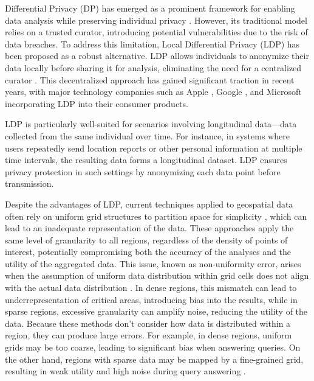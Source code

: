 Differential Privacy (DP) has emerged as a prominent framework for enabling data analysis while preserving individual privacy \cite{DBLP:conf/icalp/Dwork06,cummings2023advancing}. However, its traditional model relies on a trusted curator, introducing potential vulnerabilities due to the risk of data breaches. To address this limitation, Local Differential Privacy (LDP) has been proposed as a robust alternative. LDP allows individuals to anonymize their data locally before sharing it for analysis, eliminating the need for a centralized curator \cite{DBLP:journals/fttcs/DworkR14,kasiviswanathan2011can}. This decentralized approach has gained significant traction in recent years, with major technology companies such as Apple \cite{DBLP:conf/uss/WangBLJ17}, Google \cite{erlingsson2014rappor}, and Microsoft \cite{DBLP:conf/nips/DingKY17} incorporating LDP into their consumer products.

LDP is particularly well-suited for scenarios involving longitudinal data—data collected from the same individual over time. For instance, in systems where users repeatedly send location reports or other personal information at multiple time intervals, the resulting data forms a longitudinal dataset. LDP ensures privacy protection in such settings by anonymizing each data point before transmission.




Despite the advantages of LDP, current techniques applied to geospatial data often rely on uniform grid structures to partition space for simplicity \cite{andres2013geo,ye2021collecting}, which can lead to an inadequate representation of the data. These approaches apply the same level of granularity to all regions, regardless of the density of points of interest, potentially compromising both the accuracy of the analyses and the utility of the aggregated data. This issue, known as non-uniformity error, arises when the assumption of uniform data distribution within grid cells does not align with the actual data distribution \cite{qardaji2013differentially}. In dense regions, this mismatch can lead to underrepresentation of critical areas, introducing bias into the results, while in sparse regions, excessive granularity can amplify noise, reducing the utility of the data. 
Because these methods don't consider how data is distributed within a region, they can produce large errors.
For example, in dense regions, uniform grids may be too coarse, leading to significant bias when answering queries. On the other hand, regions with sparse data may be mapped by a fine-grained grid, resulting in weak utility and high noise during query answering \cite{qardaji2013differentially}. 


